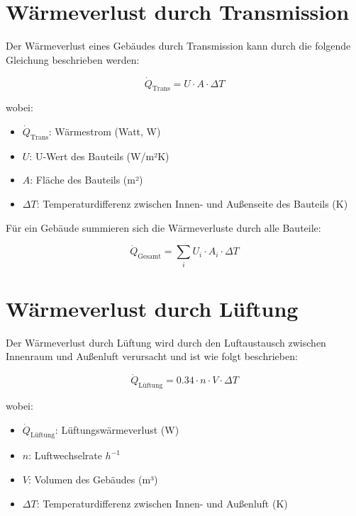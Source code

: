 \section{Wärmeverlust durch Transmission}

Der Wärmeverlust eines Gebäudes durch Transmission kann durch die folgende Gleichung beschrieben werden:

\begin{equation}
\dot{Q}_\text{Trans} = U \cdot A \cdot \Delta T
\end{equation}

\noindent
wobei:
\begin{itemize}
    \item \(\dot{Q}_\text{Trans}\): Wärmestrom (Watt, W)
    \item \(U\): U-Wert des Bauteils (W/m²K)
    \item \(A\): Fläche des Bauteils (m²)
    \item \(\Delta T\): Temperaturdifferenz zwischen Innen- und Außenseite des Bauteils (K)
\end{itemize}

Für ein Gebäude summieren sich die Wärmeverluste durch alle Bauteile:

\begin{equation}
\dot{Q}_\text{Gesamt} = \sum_{i} U_i \cdot A_i \cdot \Delta T
\end{equation}

\section{Wärmeverlust durch Lüftung}

Der Wärmeverlust durch Lüftung wird durch den Luftaustausch zwischen Innenraum und Außenluft verursacht und ist wie folgt beschrieben:

\begin{equation}
\dot{Q}_\text{Lüftung} = 0.34 \cdot n \cdot V \cdot \Delta T
\end{equation}

\noindent
wobei:
\begin{itemize}
    \item \(\dot{Q}_\text{Lüftung}\): Lüftungswärmeverlust (W)
    \item \(n\): Luftwechselrate \(h^{-1}\)
    \item \(V\): Volumen des Gebäudes (m³)
    \item \(\Delta T\): Temperaturdifferenz zwischen Innen- und Außenluft (K)
\end{itemize}


